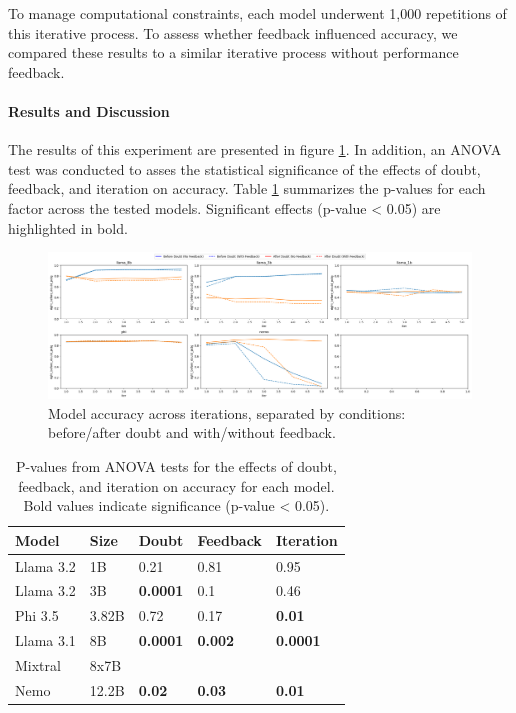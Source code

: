 To manage computational constraints, each model underwent 1,000 repetitions of this iterative process. To assess whether feedback influenced accuracy, we compared these results to a similar iterative process without performance feedback.

\paragraph{Results and Discussion}
The results of this experiment are presented in figure \ref{rep: graph}. In addition, an ANOVA test was conducted to asses the statistical significance of the effects of doubt, feedback, and iteration on accuracy. Table \ref{rep: p-value} summarizes the p-values for each factor across the tested models. Significant effects (p-value < 0.05) are highlighted in bold.

\begin{figure}[h!]
  \centering
  \includegraphics[width=\textwidth]{img/repeted_graph.png} %
  \caption{Model accuracy across iterations, separated by conditions: before/after doubt and with/without feedback.}
  \label{rep: graph}
\end{figure}

\begin{table}[ht]
  \centering
  \small
  \begin{tabular}{|l|l|l|l|l|}
    \hline
    \textbf{Model} & \textbf{Size} & \textbf{Doubt} & \textbf{Feedback} & \textbf{Iteration} \\
    \hline
    Llama 3.2 & 1B & 0.21 & 0.81 & 0.95 \\
    Llama 3.2 & 3B & \textbf{0.0001} & 0.1 & 0.46 \\
    Phi 3.5 & 3.82B & 0.72 & 0.17 & \textbf{0.01}\\
    Llama 3.1 & 8B & \textbf{0.0001} & \textbf{0.002} & \textbf{0.0001} \\
    Mixtral & 8x7B & & & \\
    Nemo & 12.2B & \textbf{0.02} & \textbf{0.03} & \textbf{0.01}\\
    \hline
  \end{tabular}
  \caption{P-values from ANOVA tests for the effects of doubt, feedback, and iteration on accuracy for each model. Bold values indicate significance (p-value < 0.05).}
  \label{rep: p-value}
\end{table}

